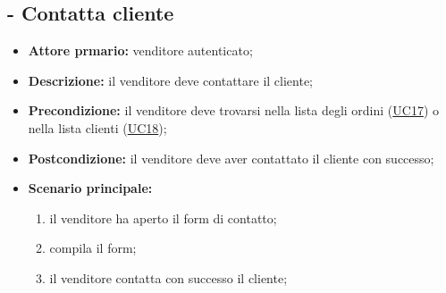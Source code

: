 \stepUserCase
\subsection{ - Contatta cliente}
\begin{itemize}
    \item \textbf{Attore prmario:} venditore autenticato;
    \item \textbf{Descrizione:} il venditore deve contattare il cliente;
    \item \textbf{Precondizione:} il venditore deve trovarsi nella lista degli ordini (\hyperref[UC17]{UC17}) o nella lista clienti (\hyperref[UC18]{UC18});
    \item \textbf{Postcondizione:} il venditore deve aver contattato il cliente con successo;
    \item \textbf{Scenario principale:}
          \begin{enumerate}
              \item il venditore ha aperto il form di contatto;
              \item compila il form;
              \item il venditore contatta con successo il cliente;
          \end{enumerate}
\end{itemize}

\stepUserCase
